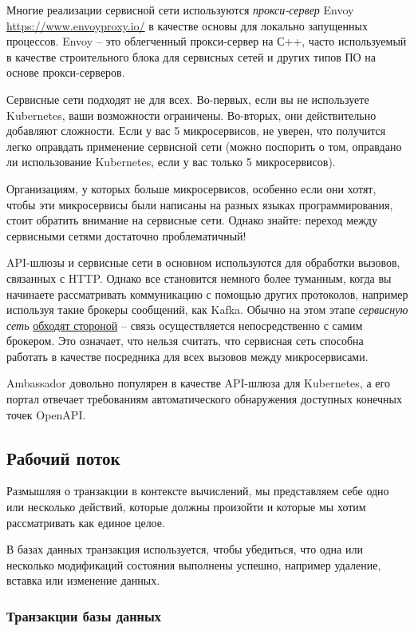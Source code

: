 \documentclass[%
	11pt,
	a4paper,
	utf8,
		]{article}
\begin{document}
Многие реализации сервисной сети используются \emph{прокси-сервер} Envoy \url{https://www.envoyproxy.io/} в качестве основы для локально запущенных процессов. Envoy -- это облегченный прокси-сервер на С++, часто используемый в качестве строительного блока для сервисных сетей и других типов ПО на основе прокси-серверов.

Сервисные сети подходят не для всех. Во-первых, если вы не используете Kubernetes, ваши возможности ограничены. Во-вторых, они действительно добавляют сложности. Если у вас 5 микросервисов, не уверен, что получится легко оправдать применение сервисной сети (можно поспорить о том, оправдано ли использование Kubernetes, если у вас только 5 микросервисов).

Организациям, у которых больше микросервисов, особенно если они хотят, чтобы эти микросервисы были написаны на разных языках программирования, стоит обратить внимание на сервисные сети. Однако знайте: переход между сервисными сетями достаточно проблематичный! \cite[]{microservices-2024}

API-шлюзы и сервисные сети в основном используются для обработки вызовов, связанных с HTTP. Однако все становится немного более туманным, когда вы начинаете рассматривать коммуникацию с помощью других протоколов, например используя такие брокеры сообщений, как Kafka. {\color{red}Обычно на этом этапе \emph{сервисную сеть} \underline{обходят стороной} -- связь осуществляется непосредственно с самим брокером.} Это означает, что нельзя считать, что сервисная сеть способна работать в качестве посредника для всех вызовов между микросервисами.

Ambassador довольно популярен в качестве API-шлюза для Kubernetes, а его портал отвечает требованиям автоматического обнаружения доступных конечных точек OpenAPI.

\subsection{Рабочий поток}

Размышляя о транзакции в контексте вычислений, мы представляем себе одно или несколько действий, которые должны произойти и которые мы хотим рассматривать как единое целое.

В базах данных транзакция используется, чтобы убедиться, что одна или несколько модификаций состояния выполнены успешно, например удаление, вставка или изменение данных.

\subsubsection{Транзакции базы данных}
\end{document}
